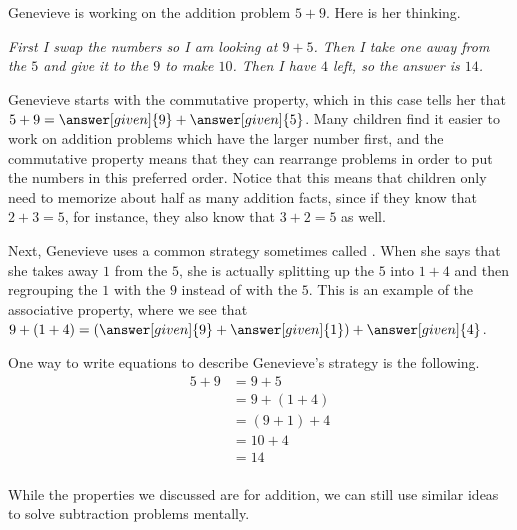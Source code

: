 \documentclass{ximera}
\begin{document}
\begin{example}
Genevieve is working on the addition problem $5 + 9$. Here is her thinking.

\emph{First I swap the numbers so I am looking at $9+5$. Then I take one away from the $5$ and give it to the $9$ to make $10$. Then I have $4$ left, so the answer is $14$.}

Genevieve starts with the commutative property, which in this case tells her that $5+9 = \answer[given]{9} + \answer[given]{5}$. Many children find it easier to work on addition problems which have the larger number first, and the commutative property means that they can rearrange problems in order to put the numbers in this preferred order. Notice that this means that children only need to memorize about half as many addition facts, since if they know that $2+3=5$, for instance, they also know that $3+2=5$ as well. 

Next, Genevieve uses a common strategy sometimes called . When she says that she takes away $1$ from the $5$, she is actually splitting up the $5$ into $1+4$ and then regrouping the $1$ with the $9$ instead of with the $5$. This is an example of the associative property, where we see that $9+(1+4) = \left (\answer[given]{9} + \answer[given]{1} \right ) + \answer[given]{4}$.

One way to write equations to describe Genevieve's strategy is the following.
\begin{align*}
5 + 9 &= 9+5 \\
&= 9 + (1+4) \\
&= (9+1)+4\\
&= 10 + 4 \\
&= 14 \\
\end{align*}

\end{example}

While the properties we discussed are for addition, we can still use similar ideas to solve subtraction problems mentally.
\end{document}
